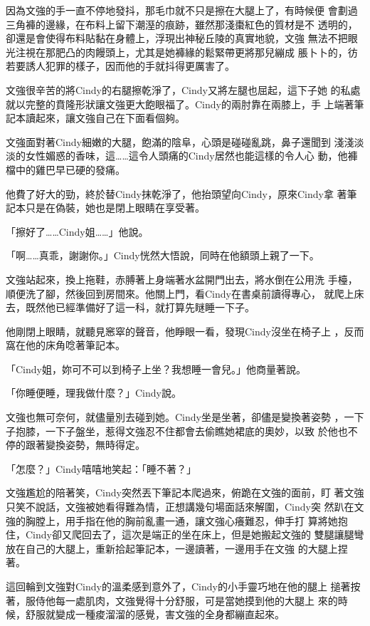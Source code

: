 因為文強的手一直不停地發抖，那毛巾就不只是擦在大腿上了，有時候便
會劃過三角褲的邊緣，在布料上留下潮溼的痕跡，雖然那淺棗紅色的質材是不
透明的，卻還是會使得布料貼黏在身體上，浮現出神秘丘陵的真實地貌，文強
無法不把眼光注視在那肥凸的肉饅頭上，尤其是她褲緣的鬆緊帶更將那兒繃成
脹卜卜的，彷若要誘人犯罪的樣子，因而他的手就抖得更厲害了。

文強很辛苦的將Cindy的右腿擦乾淨了，Cindy又將左腿也屈起，這下子她
的私處就以完整的賁隆形狀讓文強更大飽眼福了。Cindy的兩肘靠在兩膝上，手
上端著筆記本讀起來，讓文強自己在下面看個夠。

文強面對著Cindy細嫩的大腿，飽滿的陰阜，心頭是碰碰亂跳，鼻子還聞到
淺淺淡淡的女性媚惑的香味，這……這令人頭痛的Cindy居然也能這樣的令人心
動，他褲檔中的雞巴早已硬的發痛。

他費了好大的勁，終於替Cindy抹乾淨了，他抬頭望向Cindy，原來Cindy拿
著筆記本只是在偽裝，她也是閉上眼睛在享受著。

「擦好了……Cindy姐……」他說。

「啊……真乖，謝謝你。」Cindy恍然大悟說，同時在他額頭上親了一下。

文強站起來，換上拖鞋，赤膊著上身端著水盆開門出去，將水倒在公用洗
手檯，順便洗了腳，然後回到房間來。他關上門，看Cindy在書桌前讀得專心，
就爬上床去，既然他已經準備好了這一科，就打算先瞇睡一下子。

他剛閉上眼睛，就聽見窸窣的聲音，他睜眼一看，發現Cindy沒坐在椅子上
，反而窩在他的床角唸著筆記本。

「Cindy姐，妳可不可以到椅子上坐？我想睡一會兒。」他商量著說。

「你睡便睡，理我做什麼？」Cindy說。

文強也無可奈何，就儘量別去碰到她。Cindy坐是坐著，卻儘是變換著姿勢
，一下子抱膝，一下子盤坐，惹得文強忍不住都會去偷瞧她裙底的奧妙，以致
於他也不停的跟著變換姿勢，無時得定。

「怎麼？」Cindy嘻嘻地笑起：「睡不著？」

文強尷尬的陪著笑，Cindy突然丟下筆記本爬過來，俯跪在文強的面前，盯
著文強只笑不說話，文強被她看得難為情，正想講幾句場面話來解圍，Cindy突
然趴在文強的胸膛上，用手指在他的胸前亂畫一通，讓文強心癢難忍，伸手打
算將她抱住，Cindy卻又爬回去了，這次是端正的坐在床上，但是她搬起文強的
雙腿讓腿彎放在自己的大腿上，重新拾起筆記本，一邊讀著，一邊用手在文強
的大腿上捏著。

這回輪到文強對Cindy的溫柔感到意外了，Cindy的小手靈巧地在他的腿上
搥著按著，服侍他每一處肌肉，文強覺得十分舒服，可是當她摸到他的大腿上
來的時候，舒服就變成一種痠溜溜的感覺，害文強的全身都繃直起來。

